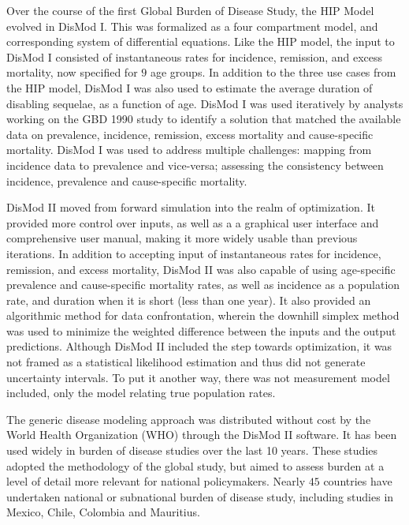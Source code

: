 Over the course of the first Global Burden of Disease Study, the HIP
Model evolved in DisMod
I.\cite{murray_global_1996}
This was formalized as a four compartment model, and corresponding
system of differential equations.  Like the HIP model, the input to
DisMod I consisted of instantaneous rates for incidence, remission,
and excess mortality, now specified for $9$ age groups.  In addition
to the three use cases from the HIP model, DisMod I was also used to
estimate the average duration of disabling sequelae, as a function of
age.  DisMod I was used iteratively by analysts working on the GBD 1990
study to identify a solution that matched the available data on
prevalence, incidence, remission, excess mortality and cause-specific
mortality.  DisMod I was used to address multiple challenges: mapping
from incidence data to prevalence and vice-versa; assessing the
consistency between incidence, prevalence and cause-specific mortality.

DisMod II moved from forward simulation into the realm of
optimization.  It provided more control over inputs, as well as a a
graphical user interface and comprehensive user manual, making it more
widely usable than previous iterations.\cite{Barendregt_Generic_2003}
In addition to accepting input of instantaneous rates for incidence,
remission, and excess mortality, DisMod II was also capable of using
age-specific prevalence and cause-specific mortality rates, as well as
incidence as a population rate, and duration when it is short (less
than one year).  It also provided an algorithmic method for data
confrontation, wherein the downhill simplex method was used to
minimize the weighted difference between the inputs and the output
predictions.  Although DisMod II included the step towards
optimization, it was not framed as a statistical likelihood estimation
and thus did not generate uncertainty intervals.  To put it another
way, there was not measurement model included, only the model relating
true population rates.

The generic disease modeling approach was distributed without cost by
the World Health Organization (WHO) through the DisMod II software. It
has been used widely in burden of disease studies over the last 10
years. These studies adopted the methodology of the global study, but
aimed to assess burden at a level of detail more relevant for national
policymakers. Nearly $45$ countries have undertaken national or
subnational burden of disease study, including studies in Mexico,
Chile, Colombia and
Mauritius.\cite{Lozano_Burden_1995,republica_de_colombia_ministerio_de_salud_carga_1994,concha_barrientos_carga_1996,Vos_Mauritius_1996}

